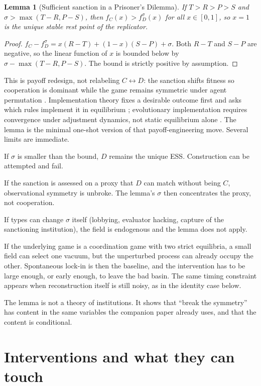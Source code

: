 \documentclass[11pt]{article}
\newtheorem{lemma}{Lemma}
\begin{document}
\begin{lemma}[Sufficient sanction in a Prisoner's Dilemma]
\label{lem:sanction}
If \(T>R>P>S\) and \(\sigma>\max(T-R,P-S)\), then \(f_C(x)>f_D^\sigma(x)\) for all \(x\in[0,1]\), so \(x=1\) is the unique stable rest point of the replicator.
\end{lemma}

\begin{proof}
\(f_C-f_D^\sigma = x(R-T)+(1-x)(S-P)+\sigma\). Both \(R-T\) and \(S-P\) are negative, so the linear function of \(x\) is bounded below by \(\sigma-\max(T-R,P-S)\). The bound is strictly positive by assumption.
\end{proof}

This is payoff redesign, not relabeling \(C\leftrightarrow D\): 
the sanction shifts fitness so cooperation is dominant while the game remains symmetric under agent permutation \parencite{newton2021}. 
Implementation theory fixes a desirable outcome first and asks which rules implement it in equilibrium \parencite{maskin1999}; evolutionary implementation requires convergence under adjustment dynamics, not static equilibrium alone \parencite{sandholm2002}. 
The lemma is the minimal one-shot version of that payoff-engineering move. 
Several limits are immediate.

If \(\sigma\) is smaller than the bound, \(D\) remains the unique ESS. Construction can be attempted and fail.

If the sanction is assessed on a proxy that \(D\) can match without being \(C\), observational symmetry is unbroke. The lemma's \(\sigma\) then concentrates the proxy, not cooperation.

If types can change \(\sigma\) itself (lobbying, evaluator hacking, capture of the sanctioning institution), the field is endogenous and the lemma does not apply.

If the underlying game is a coordination game with two strict equilibria, a small field can select one vacuum, but the unperturbed process can already occupy the other. Spontaneous lock-in is then the baseline, and the intervention has to be large enough, or early enough, to leave the bad basin. The same timing constraint appears when reconstruction itself is still noisy, as in the identity case below.

The lemma is not a theory of institutions. It shows that ``break the symmetry'' has content in the same variables the companion paper already uses, and that the content is conditional.

\section{Interventions and what they can touch}
\end{document}
